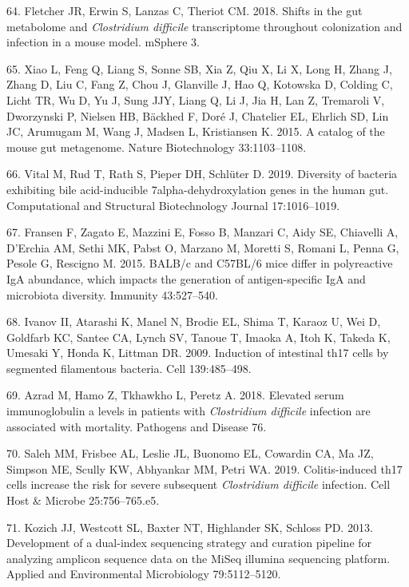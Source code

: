 \documentclass[11pt,]{article}
\begin{document}
\hypertarget{ref-Fletcher2018}{}
64. Fletcher JR, Erwin S, Lanzas C, Theriot CM. 2018. Shifts in the gut
metabolome and \emph{Clostridium difficile} transcriptome throughout
colonization and infection in a mouse model. mSphere 3.

\hypertarget{ref-Xiao2015}{}
65. Xiao L, Feng Q, Liang S, Sonne SB, Xia Z, Qiu X, Li X, Long H, Zhang
J, Zhang D, Liu C, Fang Z, Chou J, Glanville J, Hao Q, Kotowska D,
Colding C, Licht TR, Wu D, Yu J, Sung JJY, Liang Q, Li J, Jia H, Lan Z,
Tremaroli V, Dworzynski P, Nielsen HB, Bäckhed F, Doré J, Chatelier EL,
Ehrlich SD, Lin JC, Arumugam M, Wang J, Madsen L, Kristiansen K. 2015. A
catalog of the mouse gut metagenome. Nature Biotechnology 33:1103--1108.

\hypertarget{ref-Vital2019}{}
66. Vital M, Rud T, Rath S, Pieper DH, Schlüter D. 2019. Diversity of
bacteria exhibiting bile acid-inducible 7alpha-dehydroxylation genes in
the human gut. Computational and Structural Biotechnology Journal
17:1016--1019.

\hypertarget{ref-Fransen2015}{}
67. Fransen F, Zagato E, Mazzini E, Fosso B, Manzari C, Aidy SE,
Chiavelli A, D'Erchia AM, Sethi MK, Pabst O, Marzano M, Moretti S,
Romani L, Penna G, Pesole G, Rescigno M. 2015. BALB/c and C57BL/6 mice
differ in polyreactive IgA abundance, which impacts the generation of
antigen-specific IgA and microbiota diversity. Immunity 43:527--540.

\hypertarget{ref-Ivanov2009}{}
68. Ivanov II, Atarashi K, Manel N, Brodie EL, Shima T, Karaoz U, Wei D,
Goldfarb KC, Santee CA, Lynch SV, Tanoue T, Imaoka A, Itoh K, Takeda K,
Umesaki Y, Honda K, Littman DR. 2009. Induction of intestinal th17 cells
by segmented filamentous bacteria. Cell 139:485--498.

\hypertarget{ref-Azrad2018}{}
69. Azrad M, Hamo Z, Tkhawkho L, Peretz A. 2018. Elevated serum
immunoglobulin a levels in patients with \emph{Clostridium difficile}
infection are associated with mortality. Pathogens and Disease 76.

\hypertarget{ref-Saleh2019}{}
70. Saleh MM, Frisbee AL, Leslie JL, Buonomo EL, Cowardin CA, Ma JZ,
Simpson ME, Scully KW, Abhyankar MM, Petri WA. 2019. Colitis-induced
th17 cells increase the risk for severe subsequent \emph{Clostridium
difficile} infection. Cell Host \& Microbe 25:756--765.e5.

\hypertarget{ref-Kozich2013}{}
71. Kozich JJ, Westcott SL, Baxter NT, Highlander SK, Schloss PD. 2013.
Development of a dual-index sequencing strategy and curation pipeline
for analyzing amplicon sequence data on the MiSeq illumina sequencing
platform. Applied and Environmental Microbiology 79:5112--5120.
\end{document}
